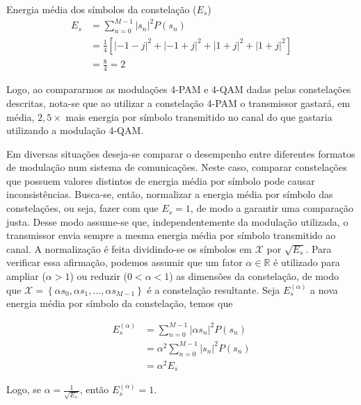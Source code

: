 \documentclass[
  ignorenonframetext,
]{beamer}
\begin{document}
\begin{frame}{Energia média dos símbolos da constelação (\(E_s\))}
\[ \begin{aligned} E_s &=\sum_{n=0}^{M-1}|s_n|^2P(s_n) \\ &=  \frac{1}{4}\left[|-1-j|^2+|-1+j|^2+|1+j|^2+|1+j|^2\right] \\ &=  \frac{8}{4} = 2\end{aligned} \]

Logo, ao compararmos as modulações 4-PAM e 4-QAM dadas pelas
constelações descritas, nota-se que ao utilizar a constelação 4-PAM o
transmissor gastará, em média, \(2,5\times\) mais energia por símbolo
transmitido no canal do que gastaria utilizando a modulação 4-QAM.

Em diversas situações deseja-se comparar o desempenho entre diferentes
formatos de modulação num sistema de comunicações. Neste caso, comparar
constelações que possuem valores distintos de energia média por símbolo
pode causar inconsistências. Busca-se, então, normalizar a energia média
por símbolo das constelações, ou seja, fazer com que \(E_s = 1\), de
modo a garantir uma comparação justa. Desse modo assume-se que,
independentemente da modulação utilizada, o transmissor envia sempre a
mesma energia média por símbolo transmitido ao canal. A normalização é
feita dividindo-se os símbolos em \(\mathcal{X}\) por \(\sqrt{E_s}\).
Para verificar essa afirmação, podemos assumir que um fator
\(\alpha\in \mathbb{R}\) é utilizado para ampliar (\(\alpha>1\)) ou
reduzir (\(0<\alpha<1\)) as dimensões da constelação, de modo que
\(\mathcal{X} = \left\lbrace \alpha s_0,  \alpha s_1, \dots, \alpha s_{M-1}\right\rbrace\)
é a constelação resultante. Seja \(E_s^{(\alpha)}\) a nova energia média
por símbolo da constelação, temos que

\[\begin{aligned} E_s^{(\alpha)} &= \sum_{n=0}^{M-1}|\alpha s_n|^2P(s_n) \\ &= \alpha^2\sum_{n=0}^{M-1}|s_n|^2P(s_n) \\ &= \alpha^2 E_s\end{aligned} \]

Logo, se \(\alpha = \frac{1}{\sqrt{E_s}}\), então \(E_s^{(\alpha)}=1\).
\end{frame}
\end{document}
